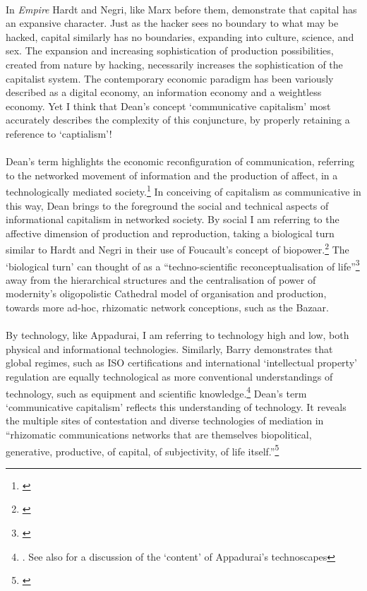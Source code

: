 \paragraph{}In \textit{Empire} Hardt and Negri, like Marx before them, demonstrate that capital has an expansive character. Just as the hacker sees no boundary to what may be hacked, capital similarly has no boundaries, expanding into culture, science, and sex. The expansion and increasing sophistication of production possibilities, created from nature by hacking, necessarily increases the sophistication of the capitalist system. The contemporary economic paradigm has been variously described as a digital economy, an information economy and a weightless economy. Yet I think that Dean's concept `communicative capitalism' most accurately describes the complexity of this conjuncture, by properly retaining a reference to `captialism'!

\paragraph{}Dean's term highlights the economic reconfiguration of communication, referring to the networked movement of information and the production of affect, in a technologically mediated society.\footnote{\cite[pp. 272-273]{dean:2005cc}} In conceiving of capitalism as communicative in this way, Dean brings to the foreground the social and technical aspects of informational capitalism in networked society. By social I am referring to the affective dimension of production and reproduction, taking a biological turn similar to Hardt and Negri in their use of Foucault's concept of biopower.\footnote{\cite[p. 28]{Hardt:2001jl}} The `biological turn' can thought of as a ``techno-scientific reconceptualisation of life''\footnote{\cite[p. 101]{Terranova:2004ly}} away from the hierarchical structures and the centralisation of power of modernity's oligopolistic Cathedral model of organisation and production, towards more ad-hoc, rhizomatic network conceptions, such as the Bazaar.

\paragraph{}By technology, like Appadurai, I am referring to technology high and low, both physical and informational technologies. Similarly, Barry demonstrates that global regimes, such as ISO certifications and international `intellectual property' regulation are equally technological as more conventional understandings of technology, such as equipment and scientific knowledge.\footnote{\cite[p. 34]{Appadurai:1996lp}. See also \cite[Chapter 2, \textit{Technological Zones}]{Barry:2001ff} for a discussion of the `content' of Appadurai's technoscapes} Dean's term `communicative capitalism' reflects this understanding of technology. It reveals the multiple sites of contestation and diverse technologies of mediation in ``rhizomatic communications networks that are themselves biopolitical, generative, productive, of capital, of subjectivity, of life itself.''\footnote{\cite[p. 285]{dean:2005cc}}

